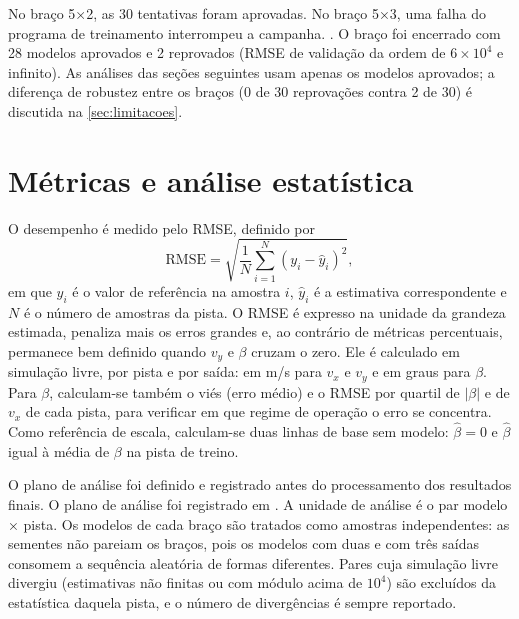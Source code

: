 No braço 5×2, as 30 tentativas foram aprovadas. No braço 5×3, uma falha do programa de treinamento interrompeu a campanha. . O braço foi encerrado com 28 modelos aprovados e 2 reprovados (RMSE de validação da ordem de $6\times10^{4}$ e infinito). As análises das seções seguintes usam apenas os modelos aprovados; a diferença de robustez entre os braços (0 de 30 reprovações contra 2 de 30) é discutida na \autoref{sec:limitacoes}.

\section{Métricas e análise estatística}\label{sec:analise}

O desempenho é medido pelo RMSE, definido por
\begin{equation}
    \mathrm{RMSE} = \sqrt{\frac{1}{N} \sum_{i=1}^{N} (y_i - \hat y_i)^2},
    \label{eq:rmse}
\end{equation}
em que $y_i$ é o valor de referência na amostra $i$, $\hat y_i$ é a estimativa correspondente e $N$ é o número de amostras da pista. O RMSE é expresso na unidade da grandeza estimada, penaliza mais os erros grandes e, ao contrário de métricas percentuais, permanece bem definido quando $v_y$ e $\beta$ cruzam o zero. Ele é calculado em simulação livre, por pista e por saída: em m/s para $v_x$ e $v_y$ e em graus para $\beta$. Para $\beta$, calculam-se também o viés (erro médio) e o RMSE por quartil de $|\beta|$ e de $v_x$ de cada pista, para verificar em que regime de operação o erro se concentra. Como referência de escala, calculam-se duas linhas de base sem modelo: $\hat\beta = 0$ e $\hat\beta$ igual à média de $\beta$ na pista de treino.

O plano de análise foi definido e registrado antes do processamento dos resultados finais. O plano de análise foi registrado em . A unidade de análise é o par modelo × pista. Os modelos de cada braço são tratados como amostras independentes: as sementes não pareiam os braços, pois os modelos com duas e com três saídas consomem a sequência aleatória de formas diferentes. Pares cuja simulação livre divergiu (estimativas não finitas ou com módulo acima de $10^4$) são excluídos da estatística daquela pista, e o número de divergências é sempre reportado.

